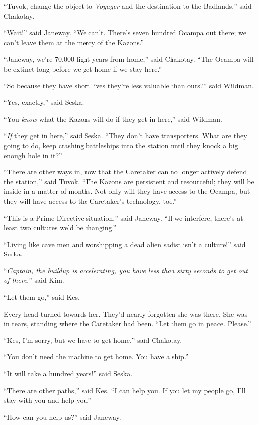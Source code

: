 \documentclass[twoside,letterpaper,12pt]{memoir}
\begin{document}
``Tuvok, change the object to \textit{Voyager} and the destination to the Badlands,” said Chakotay. 

``Wait!” said Janeway. ``We can’t. There’s seven hundred Ocampa out there; we can’t leave them at the mercy of the Kazons.” 

``Janeway, we’re 70,000 light years from home,” said Chakotay. ``The Ocampa will be extinct long before we get home if we stay here.” 

``So because they have short lives they’re less valuable than ours?” said Wildman. 

``Yes, exactly,” said Seska. 

``You \textit{know} what the Kazons will do if they get in here,” said Wildman. 

``\textit{If} they get in here,” said Seska. ``They don’t have transporters. What are they going to do, keep crashing battleships into the station until they knock a big enough hole in it?” 

``There are other ways in, now that the Caretaker can no longer actively defend the station,” said Tuvok. ``The Kazons are persistent and resourceful; they will be inside in a matter of months. Not only will they have access to the Ocampa, but they will have access to the Caretaker’s technology, too.” 

``This is a Prime Directive situation,” said Janeway. ``If we interfere, there’s at least two cultures we’d be changing.” 

``Living like cave men and worshipping a dead alien sadist isn’t a culture!” said Seska. 

``\textit{Captain, the buildup is accelerating, you have less than sixty seconds to get out of there},” said Kim. 

``Let them go,” said Kes. 

Every head turned towards her. They’d nearly forgotten she was there. She was in tears, standing where the Caretaker had been. ``Let them go in peace. Please.” 

``Kes, I’m sorry, but we have to get home,” said Chakotay. 

``You don’t need the machine to get home. You have a ship.” 

``It will take a hundred years!” said Seska. 

``There are other paths,” said Kes. ``I can help you. If you let my people go, I’ll stay with you and help you.” 

``How can you help us?” said Janeway. 
\end{document}
